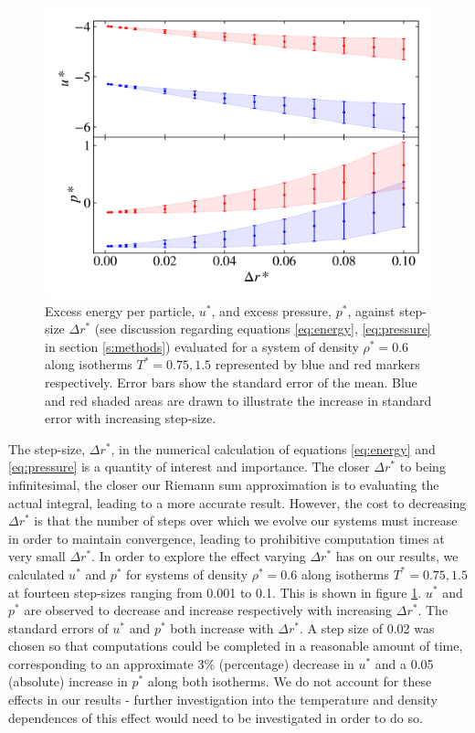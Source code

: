 \documentclass[10pt, twocolumn]{revtex4}    %
\begin{document}
\begin{figure}
	\includegraphics[width=\linewidth]{figures/binWidth/BWFeffect.png}
	\caption{Excess energy per particle, $u^{*}$, and excess pressure, $p^{*}$, against step-size $\Delta{}r^{*}$ (see discussion regarding equations \ref{eq:energy}, \ref{eq:pressure} in section \ref{s:methods}) evaluated for a system of density $\rho{}^{*}=0.6$ along isotherms $T^{*}=0.75, 1.5$ represented by blue and red markers respectively. Error bars show the standard error of the mean. Blue and red shaded areas are drawn to illustrate the increase in standard error with increasing step-size.}
	\label{fig:BWF}
\end{figure}


The step-size, $\Delta{}r^{*}$, in the numerical calculation of equations \ref{eq:energy} and \ref{eq:pressure} is a quantity of interest and importance. The closer $\Delta{}r^{*}$ to being infinitesimal, the closer our Riemann sum approximation is to evaluating the actual integral, leading to a more accurate result. However, the cost to decreasing $\Delta{}r^{*}$ is that the number of steps over which we evolve our systems must increase in order to maintain convergence, leading to prohibitive computation times at very small $\Delta{}r^{*}$. In order to explore the effect varying $\Delta{}r^{*}$ has on our results, we calculated $u^{*}$ and $p^{*}$ for systems of density $\rho{}^{*}=0.6$ along isotherms $T^{*}=0.75, 1.5$ at fourteen step-sizes ranging from \num{0.001} to \num{0.1}. This is shown in figure \ref{fig:BWF}. $u^{*}$ and $p^{*}$ are observed to decrease and increase respectively with increasing $\Delta{}r^{*}$. The standard errors of $u^{*}$ and $p^{*}$ both increase with $\Delta{}r^{*}$. A step size of \num{0.02} was chosen so that computations could be completed in a reasonable amount of time, corresponding to an approximate \num{3}\% (percentage) decrease in $u^{*}$ and a \num{0.05} (absolute) increase in $p^{*}$ along both isotherms. We do not account for these effects in our results - further investigation into the temperature and density dependences of this effect would need to be investigated in order to do so.
\end{document}
